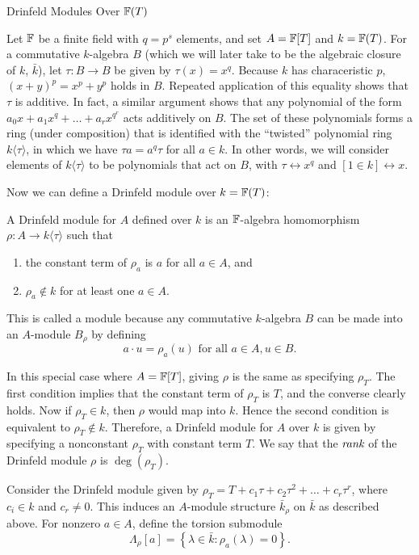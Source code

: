 \documentclass[12pt]{article}
\begin{document}
\begin{section}{Drinfeld Modules Over ${\mathbb F}(T)$}

Let ${\mathbb F}$ be a finite field with $q = p^s$ elements, and set $A = {\mathbb F}[T]$
and $k = {\mathbb F}(T)$.  For a commutative $k$-algebra $B$ (which we will later
take to be the algebraic closure of $k$, $\bar{k}$), let
$\tau: B \rightarrow B$ be given by $\tau(x) = x^q$.  Because $k$ has
characeristic $p$, $(x+y)^p = x^p + y^p$ holds in $B$.  Repeated
application of this equality shows that $\tau$ is additive.  In fact, a
similar argument shows that any polynomial of the form
$a_0x + a_1x^q + \ldots + a_rx^{q^r}$ acts additively on $B$.  The set of
these polynomials forms a ring (under composition) that is identified with
the ``twisted'' polynomial ring $k\langle\tau\rangle$, in which we have
$\tau a = a^q\tau$ for all $a \in k$.  In other words, we will consider
elements of $k\langle\tau\rangle$ to be polynomials that act on $B$, with
$\tau \leftrightarrow x^q$ and $[1 \in k] \leftrightarrow x$.

Now we can define a Drinfeld module over $k = {\mathbb F}(T)$:
\begin{definition}
A Drinfeld module for $A$ defined over $k$ is an ${\mathbb F}$-algebra homomorphism
$\rho: A \rightarrow k\langle\tau\rangle$ such that
\begin{enumerate}
\item
the constant term of $\rho_a$ is $a$ for all $a \in A$, and
\item
$\rho_a \notin k$ for at least one $a \in A$.
\end{enumerate}
\end{definition}
This is called a module because any commutative $k$-algebra $B$ can be
made into an $A$-module $B_\rho$ by defining
$$a\cdot u = \rho_a(u) \text{ for all }a \in A, u \in B.$$

In this special case where $A = {\mathbb F}[T]$, giving $\rho$ is the same as
specifying $\rho_T$.  The first condition implies that the constant term
of $\rho_T$ is $T$, and the converse clearly holds.  Now if $\rho_T \in k$,
then $\rho$ would map into $k$.  Hence the second condition is equivalent
to $\rho_T \notin k$.  Therefore, a Drinfeld module for $A$ over $k$ is
given by specifying a nonconstant $\rho_T$ with constant term $T$.  We say
that the $\emph{rank}$ of the Drinfeld module $\rho$ is $\deg(\rho_T)$.

Consider the Drinfeld module given by $\rho_T = T + c_1\tau + c_2\tau^2 +
\ldots + c_r\tau^r$, where $c_i \in k$ and $c_r \neq 0$.  This induces an
$A$-module structure $\bar{k}_\rho$ on $\bar{k}$ as described above.  For
nonzero $a \in A$, define the torsion submodule
$$\Lambda_\rho[a] = \left\{\lambda \in \bar{k}:
\rho_a(\lambda) = 0 \right\}.$$


\end{section}
\end{document}
